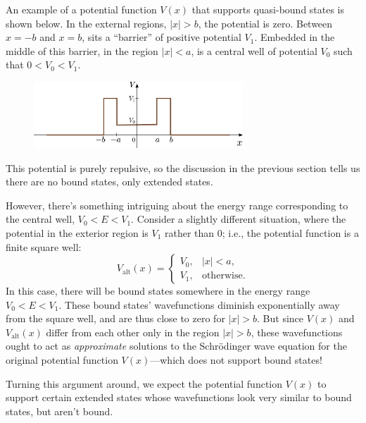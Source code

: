 \documentclass[pra,12pt]{revtex4}
\begin{document}
An example of a potential function $V(x)$ that supports quasi-bound
states is shown below.  In the external regions, $|x| > b$, the
potential is zero.  Between $x = -b$ and $x = b$, sits a ``barrier''
of positive potential $V_1$.  Embedded in the middle of this barrier,
in the region $|x| < a$, is a central well of potential $V_0$ such
that $0 < V_0 < V_1$.

\begin{figure}[h]
  \centering\includegraphics[width=0.7\textwidth]{resonancewell}
\end{figure}

This potential is purely repulsive, so the discussion in the previous
section tells us there are no bound states, only extended states.

However, there's something intriguing about the energy range
corresponding to the central well, $V_0 < E < V_1$.  Consider a
slightly different situation, where the potential in the exterior
region is $V_1$ rather than $0$; i.e., the potential function is a
finite square well:
$$V_{\mathrm{alt}}(x) = \begin{cases}V_0, & |x| < a, \\ V_1, & \mathrm{otherwise}.\end{cases}$$
In this case, there will be bound states somewhere in the energy range
$V_0 < E < V_1$.  These bound states' wavefunctions diminish
exponentially away from the square well, and are thus close to zero
for $|x| > b$.  But since $V(x)$ and $V_{\mathrm{alt}}(x)$ differ from
each other only in the region $|x| > b$, these wavefunctions ought to
act as \textit{approximate} solutions to the Schr\"odinger wave
equation for the original potential function $V(x)$---which does not
support bound states!

Turning this argument around, we expect the potential function $V(x)$
to support certain extended states whose wavefunctions look very
similar to bound states, but aren't bound.
\end{document}
